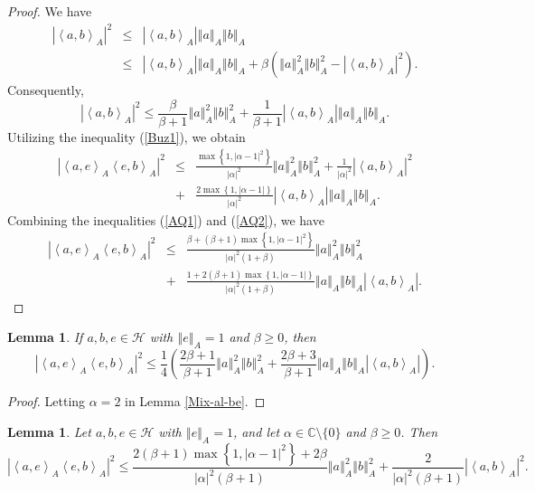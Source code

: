 \documentclass{article}
\newcommand{\bra}[1]{\left(#1\right)}
\newcommand{\seqA}[1]{{\left<#1\right>}_{A}}
\newcommand{\normA}[1]{{\left\Vert#1\right\Vert}_{A}}
\newcommand{\abs}[1]{\left\vert#1\right\vert}
\newcommand{\set}[1]{\left\{#1\right\}}
\renewcommand{\c}{\mathbb C}
\newcommand {\h}{\mathcal{H}}
\newtheorem{lemma}[theorem]{Lemma}
\begin{document}
\begin{proof} We have
\begin{eqnarray*}
  \abs{\seqA{a,b}}^2 &\leq&\abs{\seqA{a,b}}\normA{a}\normA{b} \\
   &\leq&\abs{\seqA{a,b}}\normA{a}\normA{b}+\beta\bra{\normA{a}^2\normA{b}^2-\abs{\seqA{a,b}}^2}.
\end{eqnarray*}
Consequently,
\begin{equation}\label{AQ1}
  \abs{\seqA{a,b}}^2 \leq \frac{\beta}{\beta+1}\normA{a}^2\normA{b}^2+\frac{1}{\beta+1}\abs{\seqA{a,b}}\normA{a}\normA{b}.
\end{equation}
Utilizing the inequality (\ref{Buz1}), we obtain
\begin{eqnarray}\label{AQ2}
  \abs{\seqA{a,e}\seqA{e,b}}^2 &\leq&\frac{\max\set{1,\abs{\alpha-1}^2}}{\abs{\alpha}^2}\normA{a}^2\normA{b}^2+\frac{1}{\abs{\alpha}^2}\abs{\seqA{a,b}}^2\nonumber \\
   &+&\frac{2\max\set{1,\abs{\alpha-1}}}{\abs{\alpha}^2} \abs{\seqA{a,b}}\normA{a}\normA{b}.
\end{eqnarray}
Combining the inequalities (\ref{AQ1}) and (\ref{AQ2}), we have
\begin{eqnarray*}
  \abs{\seqA{a,e}\seqA{e,b}}^2 &\leq&\frac{\beta+(\beta+1)\max\set{1,\abs{\alpha-1}^2}}{\abs{\alpha}^2(1+\beta)}\normA{a}^2\normA{b}^2 \\
   &+& \frac{1+2(\beta+1)\max\set{1,\abs{\alpha-1}}}{\abs{\alpha}^2(1+\beta)}\normA{a}\normA{b}\abs{\seqA{a,b}}.
\end{eqnarray*}
\end{proof}
\begin{lemma}\label{Buzano} If $a,b,e\in\h$ with $\normA{e}=1$ and $\beta\geq 0$, then
\begin{equation}\label{Imediae1}
  \abs{\seqA{a,e}\seqA{e,b}}^2\leq \frac{1}{4}\bra{\frac{2\beta+1}{\beta+1}\normA{a}^2\normA{b}^2+\frac{2\beta+3}{\beta+1}\normA{a}\normA{b}\abs{\seqA{a,b}}}.
\end{equation}
\end{lemma}
\begin{proof} Letting $\alpha=2$ in Lemma \ref{Mix-al-be}.
\end{proof}
\begin{lemma}\label{Ramadan-Kareem1}Let $a,b,e\in\h$ with $\normA{e}=1$, and let $\alpha\in\c\setminus\{0\}$ and $\beta\geq 0$.
Then
 $$\abs{\seqA{a,e}\seqA{e,b}}^2\leq \frac{2(\beta+1)\max\set{1,\abs{\alpha-1}^2}+2\beta}{\abs{\alpha}^2(\beta+1)}\normA{a}^2\normA{b}^2+\frac{2}{\abs{\alpha}^2(\beta+1)}\abs{\seqA{a,b}}^2.$$
\end{lemma}
\end{document}
